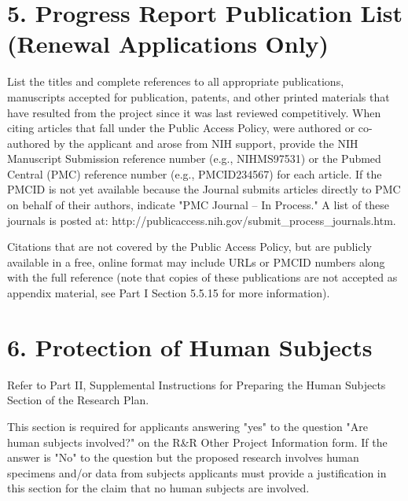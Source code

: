 \documentclass[11pt, notitlepage]{article} %
\begin{document}

\newpage

\section*{5. Progress Report Publication List (Renewal Applications Only)}

List the titles and complete references to all appropriate publications, manuscripts accepted for publication, patents, and other printed materials that have resulted from the project since it was last reviewed competitively. When citing articles that fall under the Public Access Policy, were authored or co-authored by the applicant and arose from NIH support, provide the NIH Manuscript Submission reference number (e.g., NIHMS97531) or the Pubmed Central (PMC) reference number (e.g., PMCID234567) for each article. If the PMCID is not yet available because the Journal submits articles directly to PMC on behalf of their authors, indicate "PMC Journal -- In Process." A list of these journals is posted at: http://publicaccess.nih.gov/submit\_process\_journals.htm.

Citations that are not covered by the Public Access Policy, but are publicly available in a free, online format may include URLs or PMCID numbers along with the full reference (note that copies of these publications are not accepted as appendix material, see Part I Section 5.5.15 for more information).


\newpage

\section*{6. Protection of Human Subjects}

Refer to Part II, Supplemental Instructions for Preparing the Human Subjects Section of the Research Plan.

This section is required for applicants answering "yes" to the question "Are human subjects involved?" on the R\&R Other Project Information form. If the answer is "No" to the question but the proposed research involves human specimens and/or data from subjects applicants must provide a justification in this section for the claim that no human subjects are involved.
\end{document}
